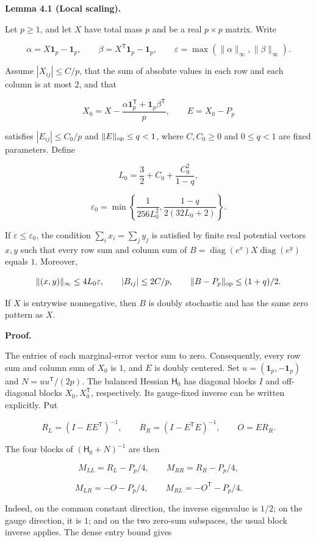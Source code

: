 \documentclass[11pt,a4paper]{article}
\begin{document}
\textbf{Lemma 4.1 (Local scaling).}

Let \(p\ge1\), and let \(X\) have total mass \(p\) and be a real \(p\times p\) matrix. Write

\[
\alpha=X\mathbf 1_p-\mathbf 1_p,\qquad \beta=X^{\mathsf T}\mathbf 1_p-\mathbf 1_p,\qquad \varepsilon=\max(\|\alpha\|_\infty,\|\beta\|_\infty).
\]

Assume \(|X_{ij}|\le C/p\), that the sum of absolute values in each row and each column is at most \(2\), and that

\[
X_0=X-\frac{\alpha\mathbf 1_p^{\mathsf T}+\mathbf 1_p\beta^{\mathsf T}}p,\qquad E=X_0-P_p
\]

satisfies \(|E_{ij}|\le C_0/p\) and \(\|E\|_{\rm op}\le q<1\), where \(C,C_0\ge0\) and \(0\le q<1\) are fixed parameters. Define

\[
L_0=\frac32+C_0+\frac{C_0^2}{1-q},
\]

\[
\varepsilon_0=\min\left\{\frac1{256L_0^2},\frac{1-q}{2(32L_0+2)}\right\}.
\]

If \(\varepsilon\le\varepsilon_0\), the condition \(\sum_i x_i=\sum_j y_j\) is satisfied by finite real potential vectors \(x,y\) such that every row sum and column sum of \(B=\operatorname{diag}(e^x)X\operatorname{diag}(e^y)\) equals \(1\). Moreover,

\[
\|(x,y)\|_\infty\le4L_0\varepsilon,\qquad |B_{ij}|\le2C/p,\qquad \|B-P_p\|_{\rm op}\le(1+q)/2.
\]

If \(X\) is entrywise nonnegative, then \(B\) is doubly stochastic and has the same zero pattern as \(X\).

\textbf{Proof.}

The entries of each marginal-error vector sum to zero. Consequently, every row sum and column sum of \(X_0\) is \(1\), and \(E\) is doubly centered. Set \(u=(\mathbf 1_p,-\mathbf 1_p)\) and \(N=uu^{\mathsf T}/(2p)\). The balanced Hessian \(\mathsf H_0\) has diagonal blocks \(I\) and off-diagonal blocks \(X_0,X_0^{\mathsf T}\), respectively. Its gauge-fixed inverse can be written explicitly. Put

\[
R_L=(I-EE^{\mathsf T})^{-1},\qquad R_R=(I-E^{\mathsf T}E)^{-1},\qquad O=ER_R.
\]

The four blocks of \((\mathsf H_0+N)^{-1}\) are then

\[
M_{LL}=R_L-P_p/4,\qquad M_{RR}=R_R-P_p/4,
\]

\[
M_{LR}=-O-P_p/4,\qquad M_{RL}=-O^{\mathsf T}-P_p/4.
\]

Indeed, on the common constant direction, the inverse eigenvalue is \(1/2\); on the gauge direction, it is \(1\); and on the two zero-sum subspaces, the usual block inverse applies. The dense entry bound gives
\end{document}
